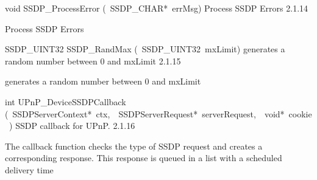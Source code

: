 \documentclass{article}
\begin{document}
\begin{cxxentry}
\begin{cxxentry}
\begin{cxxfunction}
\begin{cxxdoc}
\end{cxxdoc}
\end{cxxfunction}
\begin{cxxfunction}
{void}
        {SSDP\_ProcessError}
        {(\ SSDP\_CHAR*\ errMsg)}
        {Process SSDP Errors}
        {2.1.14}
\begin{cxxdoc}
Process SSDP Errors


\end{cxxdoc}
\end{cxxfunction}
\begin{cxxfunction}
{SSDP\_UINT32}
        {SSDP\_RandMax}
        {(\ SSDP\_UINT32\ mxLimit)}
        {generates a random number between 0 and mxLimit}
        {2.1.15}
\begin{cxxdoc}
generates a random number between 0 and mxLimit


\end{cxxdoc}
\end{cxxfunction}
\begin{cxxfunction}
{int}
        {UPnP\_DeviceSSDPCallback}
        {(\ SSDPServerContext*\ ctx,\ \ SSDPServerRequest*\ serverRequest,\ \ void*\ cookie\ )}
        {SSDP callback for UPnP. }
        {2.1.16}
\begin{cxxdoc}
The callback function checks the type of SSDP request and creates a
corresponding response. This response is queued in a list with a scheduled
delivery time



\end{cxxdoc}
\end{cxxfunction}
\end{cxxentry}
\end{cxxentry}
\end{document}
